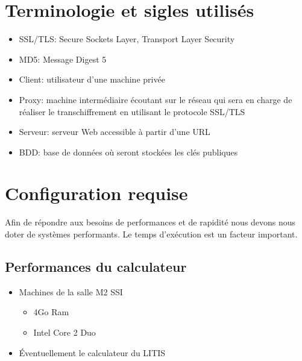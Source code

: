 \documentclass[a4paper,11pt,french]{article}
\begin{document}
\section{Terminologie et sigles utilisés}

\begin{itemize}
\item SSL/TLS: Secure Sockets Layer, Transport Layer Security 
\item MD5: Message Digest 5
\item Client: utilisateur d'une machine privée
\item Proxy: machine intermédiaire écoutant sur le réseau qui sera en charge de réaliser le transchiffrement en utilisant le protocole SSL/TLS
\item Serveur: serveur Web accessible à partir d'une URL
\item BDD: base de données où seront stockées les clés publiques
\end{itemize}


\section{Configuration requise}
Afin de répondre aux besoins de performances et de rapidité nous devons nous doter de systèmes performants. Le temps d'exécution est un facteur important.



\subsection{Performances du calculateur}
\begin{itemize}
\item Machines de la salle M2 SSI
\begin{itemize}
\item 4Go Ram
\item Intel Core 2 Duo
\end{itemize}
\item \'Eventuellement le calculateur du LITIS
\end{itemize}
\end{document}
